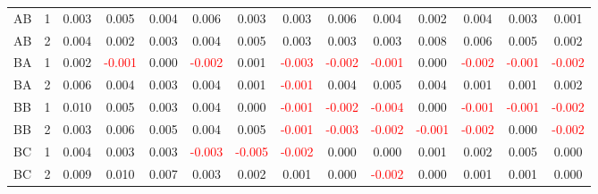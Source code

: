 \begin{table}[H]
{\begin{tabular}{llcccccccccccc}
AB & 1 & 0.003 & 0.005 & 0.004 & 0.006 & 0.003 & 0.003 & 0.006 & 0.004 & 0.002 & 0.004 & 0.003 & 0.001\\
AB & 2 & 0.004 & 0.002 & 0.003 & 0.004 & 0.005 & 0.003 & 0.003 & 0.003 & 0.008 & 0.006 & 0.005 & 0.002\\
BA & 1 & 0.002 & \textcolor{red}{-0.001} & 0.000 & \textcolor{red}{-0.002} & 0.001 & \textcolor{red}{-0.003} & \textcolor{red}{-0.002} & \textcolor{red}{-0.001} & 0.000 & \textcolor{red}{-0.002} & \textcolor{red}{-0.001} & \textcolor{red}{-0.002}\\
BA & 2 & 0.006 & 0.004 & 0.003 & 0.004 & 0.001 & \textcolor{red}{-0.001} & 0.004 & 0.005 & 0.004 & 0.001 & 0.001 & 0.002\\
BB & 1 & 0.010 & 0.005 & 0.003 & 0.004 & 0.000 & \textcolor{red}{-0.001} & \textcolor{red}{-0.002} & \textcolor{red}{-0.004} & 0.000 & \textcolor{red}{-0.001} & \textcolor{red}{-0.001} & \textcolor{red}{-0.002}\\
BB & 2 & 0.003 & 0.006 & 0.005 & 0.004 & 0.005 & \textcolor{red}{-0.001} & \textcolor{red}{-0.003} & \textcolor{red}{-0.002} & \textcolor{red}{-0.001} & \textcolor{red}{-0.002} & 0.000 & \textcolor{red}{-0.002}\\
BC & 1 & 0.004 & 0.003 & 0.003 & \textcolor{red}{-0.003} & \textcolor{red}{-0.005} & \textcolor{red}{-0.002} & 0.000 & 0.000 & 0.001 & 0.002 & 0.005 & 0.000\\
BC & 2 & 0.009 & 0.010 & 0.007 & 0.003 & 0.002 & 0.001 & 0.000 & \textcolor{red}{-0.002} & 0.000 & 0.001 & 0.001 & 0.000\\
\hline
    \end{tabular}%
    }
    \label{tab:cen8_uni}
\end{table}


